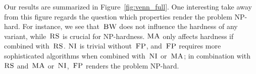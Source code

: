 Our results are summarized in
Figure~\ref{fig:venn_full}.
One interesting take away from this figure regards
the question which properties render the problem
NP-hard. For instance, we see that~$\textsc{BW}$
does not influence the hardness of any variant,
while~$\textsc{RS}$ is crucial for NP-hardness.
$\textsc{MA}$ only affects hardness if combined with~$\textsc{RS}$.
$\textsc{NI}$ is trivial without~$\textsc{FP}$, and~$\textsc{FP}$ requires
more sophisticated algorithms when combined with~$\textsc{NI}$ or~$\textsc{MA}$;
in combination with~$\textsc{RS}$ and~$\textsc{MA}$ or~$\textsc{NI}$,~$\textsc{FP}$ renders the
problem NP-hard.

